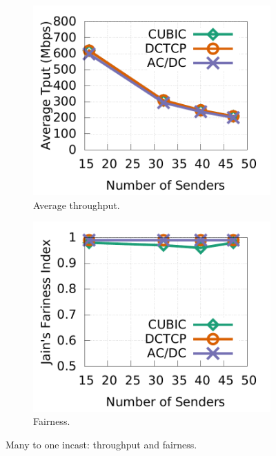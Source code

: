 \begin{figure}[!t]
        \centering
        \begin{subfigure}[b]{0.225\textwidth}
                \centering
                \includegraphics[width=\textwidth]{figures/incast/plots9k/incast_tput_vary_sender.pdf}
                \caption{Average throughput.}
                \label{incast_9k_tput}
        \end{subfigure}
        \begin{subfigure}[b]{0.225\textwidth}
                \centering
                \includegraphics[width=\textwidth]{figures/incast/plots9k/incast_fairness_vary_sender.pdf}
                \caption{Fairness.}
                \label{incast_9k_fariness}
        \end{subfigure}
        \caption{Many to one incast: throughput and fairness.}
        \label{incast_9k_tput_fairness}
\end{figure}



